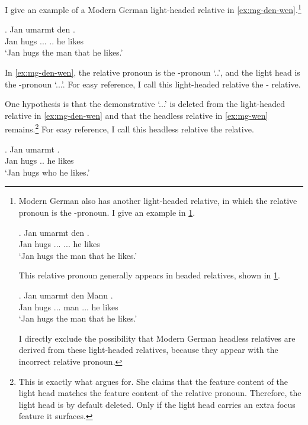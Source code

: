 I give an example of a Modern German light-headed relative in \ref{ex:mg-den-wen}.\footnote{
Modern German also has another light-headed relative, in which the relative pronoun is the -pronoun. I give an example in \ref{ex:mg-den-den}.

\exg. Jan umarmt den   .\\
Jan hugs ... ... he likes\\
`Jan hugs the man that he likes.'\label{ex:mg-den-den}

This relative pronoun generally appears in headed relatives, shown in \ref{ex:mg-den-headed}.

\exg. Jan umarmt den Mann   .\\
Jan hugs ... man ... he likes\\
`Jan hugs the man that he likes.'\label{ex:mg-den-headed}

I directly exclude the possibility that Modern German headless relatives are derived from these light-headed relatives, because they appear with the incorrect relative pronoun.
}

\exg. Jan umarmt den   .\\
Jan hugs ... .. he likes\\
`Jan hugs the man that he likes.'\label{ex:mg-den-wen}

In \ref{ex:mg-den-wen}, the relative pronoun is the -pronoun  `..', and the light head is the -pronoun  `...'. For easy reference, I call this light-headed relative the - relative.

One hypothesis is that the demonstrative  `...' is deleted from the light-headed relative in \ref{ex:mg-den-wen} and that the headless relative in \ref{ex:mg-wen} remains.\footnote{
This is exactly what \citet{hanink2018} argues for. She claims that the feature content of the light head matches the feature content of the relative pronoun. Therefore, the light head is by default deleted. Only if the light head carries an extra focus feature it surfaces.
}
For easy reference, I call this headless relative the  relative.

\exg. Jan umarmt   .\\
Jan hugs .. he likes\\
`Jan hugs who he likes.'\label{ex:mg-wen}

